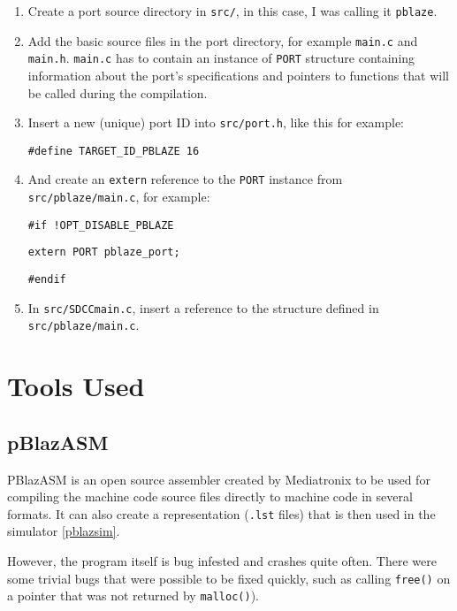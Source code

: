     \begin{enumerate}

    \item Create a port source directory in \texttt{src/}, in this case, I was calling it \texttt{pblaze}.

    \item Add the basic source files in the port directory, for example \texttt{main.c} and \texttt{main.h}. \texttt{main.c} has to contain an instance of \texttt{PORT} structure containing information about the port's specifications and pointers to functions that will be called during the compilation.

    \item Insert a new (unique) port ID into \texttt{src/port.h}, like this for example:

    \texttt{\#define TARGET\_ID\_PBLAZE    16}

    \item And create an \texttt{extern} reference to the \texttt{PORT} instance from \texttt{src/pblaze/main.c}, for example:

    \texttt{\#if !OPT\_DISABLE\_PBLAZE}

    \texttt{extern PORT pblaze\_port;}

    \texttt{\#endif}

    \item In \texttt{src/SDCCmain.c}, insert a reference to the structure defined in \texttt{src/pblaze/main.c}.

    \end{enumerate}

    \section{Tools Used}

        \subsection{pBlazASM}\label{pblazasm}

        PBlazASM is an open source assembler created by Mediatronix to be used for compiling the machine code source files directly to machine code in several formats. It can also create a representation (\texttt{.lst} files) that is then used in the simulator \ref{pblazsim}.

        However, the program itself is bug infested and crashes quite often. There were some trivial bugs that were possible to be fixed quickly, such as calling \texttt{free()} on a pointer that was not returned by \texttt{malloc()}).

